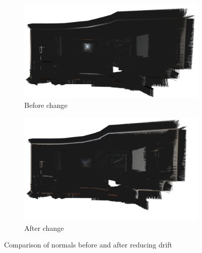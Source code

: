 \documentclass[12pt, a4paper]{article}
\begin{document}
\begin{figure}[H]
  \centering
  \begin{subfigure}[b]{0.45\textwidth}
    \includegraphics[width=\textwidth]{./results/dense_slam/normals.png}
    \caption{Before change}
  \end{subfigure}
  \hfill
  \begin{subfigure}[b]{0.45\textwidth}
    \includegraphics[width=\textwidth]{./results/dense_slam/bonus_normals.png}
    \caption{After change}
  \end{subfigure}
  \caption{Comparison of normals before and after reducing drift}
\end{figure}
\end{document}

